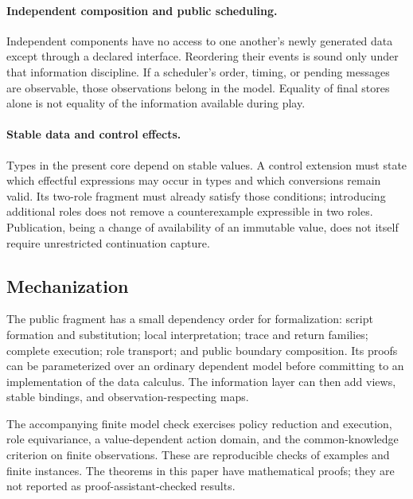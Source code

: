 \paragraph{Independent composition and public scheduling.}
Independent components have no access to one another's newly generated data
except through a declared interface. Reordering their events is sound only
under that information discipline. If a scheduler's order, timing, or pending
messages are observable, those observations belong in the model. Equality of
final stores alone is not equality of the information available during play.

\paragraph{Stable data and control effects.}
Types in the present core depend on stable values. A control extension must
state which effectful expressions may occur in types and which conversions
remain valid. Its two-role fragment must already satisfy those conditions;
introducing additional roles does not remove a counterexample expressible in
two roles. Publication, being a change of availability of an immutable value,
does not itself require unrestricted continuation capture.

\subsection{Mechanization}

The public fragment has a small dependency order for formalization:
script formation and substitution; local interpretation; trace and return
families; complete execution; role transport; and public boundary composition.
Its proofs can be parameterized over an ordinary dependent model before
committing to an implementation of the data calculus. The information layer
can then add views, stable bindings, and observation-respecting maps.

The accompanying finite model check exercises policy reduction and execution,
role equivariance, a value-dependent action domain, and the common-knowledge
criterion on finite observations. These are reproducible checks of examples
and finite instances. The theorems in this paper have mathematical proofs;
they are not reported as proof-assistant-checked results.

